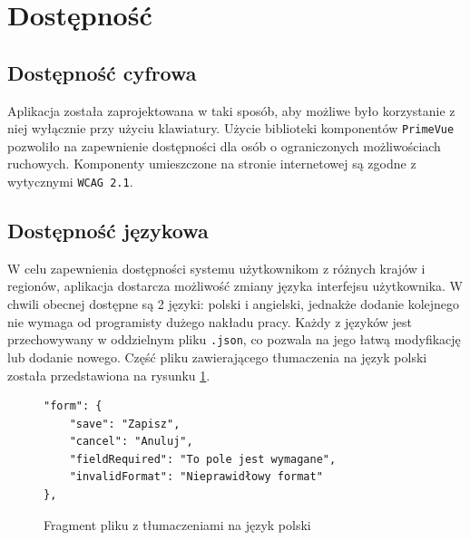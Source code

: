 \section{Dostępność}

\subsection{Dostępność cyfrowa}

Aplikacja została zaprojektowana w taki sposób, aby możliwe było korzystanie z niej wyłącznie przy użyciu klawiatury. Użycie biblioteki komponentów \texttt{PrimeVue} pozwoliło na zapewnienie dostępności dla osób o ograniczonych możliwościach ruchowych. Komponenty umieszczone na stronie internetowej są zgodne z wytycznymi \texttt{WCAG 2.1}. \cite{bib:WCAG21}

\subsection{Dostępność językowa}

W celu zapewnienia dostępności systemu użytkownikom z różnych krajów i regionów, aplikacja dostarcza możliwość zmiany języka interfejsu użytkownika. W chwili obecnej dostępne są 2 języki: polski i angielski, jednakże dodanie kolejnego nie wymaga od programisty dużego nakładu pracy. Każdy z języków jest przechowywany w oddzielnym pliku \texttt{.json}, co pozwala na jego łatwą modyfikację lub dodanie nowego. Część pliku zawierającego tłumaczenia na język polski została przedstawiona na rysunku \ref{lst:pl}.

\begin{figure}[H]
    \begin{verbatim}
"form": {
    "save": "Zapisz",
    "cancel": "Anuluj",
    "fieldRequired": "To pole jest wymagane",
    "invalidFormat": "Nieprawidłowy format"
},
\end{verbatim}
    \caption{Fragment pliku z tłumaczeniami na język polski}
    \label{lst:pl}
\end{figure}